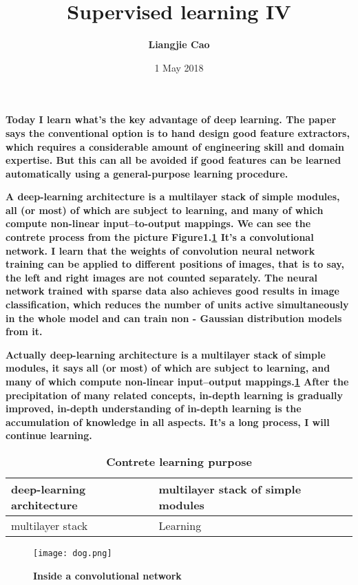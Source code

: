 \documentclass[25pt]{article}
\begin{document}
\title{\textbf{Supervised learning IV}}
\author{\textbf{Liangjie Cao}}
\date{1 May 2018}
\maketitle
\par
\textbf{Today I learn what's the key advantage of deep learning. The paper says the conventional option is to hand design good feature extractors, which requires a considerable amount of engineering skill and domain expertise. But this can all be avoided if good features can be learned automatically using a general-purpose learning procedure.\cite{name1}}\\
\par
\textbf{A deep-learning architecture is a multilayer stack of simple modules, all (or most) of which are subject to learning, and many of which compute non-linear input–to-output mappings. We can see the contrete process from the picture Figure1.\ref{Figure} It's a convolutional network. I learn that the weights of convolution neural network training can be applied to different positions of images, that is to say, the left and right images are not counted separately. The neural network trained with sparse data also achieves good results in image classification, which reduces the number of units active simultaneously in the whole model and can train non - Gaussian distribution models from it.}
\\
\par
\textbf{Actually deep-learning architecture is a multilayer stack of simple modules, it says all (or most) of which are subject to learning, and many of which compute non-linear input–output mappings.\ref{Table} After the precipitation of many related concepts, in-depth learning is gradually improved, in-depth understanding of in-depth learning is the accumulation of knowledge in all aspects. It's a long process, I will continue learning. }\\
\onecolumn
\begin{table}[!htbp]
  \centering
 \begin{tabular}{|p{3cm}|p{4cm}|p{3cm}}
   \hline
     deep-learning architecture &  multilayer stack of simple modules\\
  \hline
     multilayer stack &  Learning\\
   \hline
  \end{tabular}
  \caption{\textbf{Contrete learning purpose}} \label{Table}
  \end{table}
 \begin{figure}[ht]
 \centering
 \texttt{[image: dog.png]}\\
 \caption{\textbf{Inside a convolutional network}}\label{Figure}
\end{figure}


\end{document}
